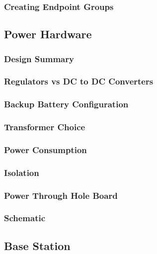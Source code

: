 \subsubsection{Creating Endpoint Groups}

\subsection{Power Hardware}

\subsubsection{Design Summary}

\subsubsection{Regulators vs DC to DC Converters}

\subsubsection{Backup Battery Configuration}

\subsubsection{Transformer Choice}

\subsubsection{Power Consumption}

\subsubsection{Isolation}

\subsubsection{Power Through Hole Board}

\subsubsection{Schematic}

\subsection{Base Station}

